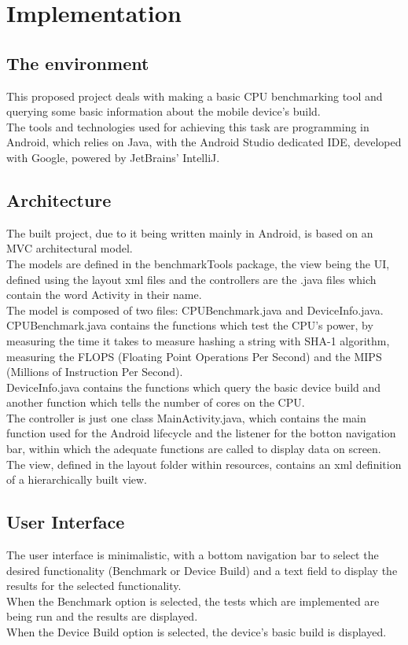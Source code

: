 \documentclass[a4paper,10pt]{report}
\begin{document}
\chapter{Implementation}
 \section{The environment}
 This proposed project deals with making a basic CPU benchmarking tool and querying some basic information about the mobile device's build.\\
 The tools and technologies used for achieving this task are programming in Android, which relies on Java, with the Android Studio dedicated IDE, developed with Google, powered by JetBrains' IntelliJ.\\
 
 \section{Architecture}
 The built project, due to it being written mainly in Android, is based on an MVC architectural model.\\
 The models are defined in the benchmarkTools package, the view being the UI, defined using the layout xml files and the controllers are the .java files which contain the word Activity in their name.\\
 The model is composed of two files: CPUBenchmark.java and DeviceInfo.java.\\
 CPUBenchmark.java contains the functions which test the CPU's power, by measuring the time it takes to measure hashing a string with SHA-1 algorithm, measuring the FLOPS (Floating Point Operations Per Second) and the MIPS (Millions of Instruction Per Second).\\
 DeviceInfo.java contains the functions which query the basic device build and another function which tells the number of cores on the CPU.\\
 The controller is just one class MainActivity.java, which contains the main function used for the Android lifecycle and the listener for the botton navigation bar, within which the adequate functions are called to display data on screen.\\
 The view, defined in the layout folder within resources, contains an xml definition of a hierarchically built view.\\
 
 \section{User Interface}
 The user interface is minimalistic, with a bottom navigation bar to select the desired functionality (Benchmark or Device Build) and a text field to display the results for the selected functionality.\\
 When the Benchmark option is selected, the tests which are implemented are being run and the results are displayed.\\
 When the Device Build option is selected, the device's basic build is displayed.\\
 
\end{document}
